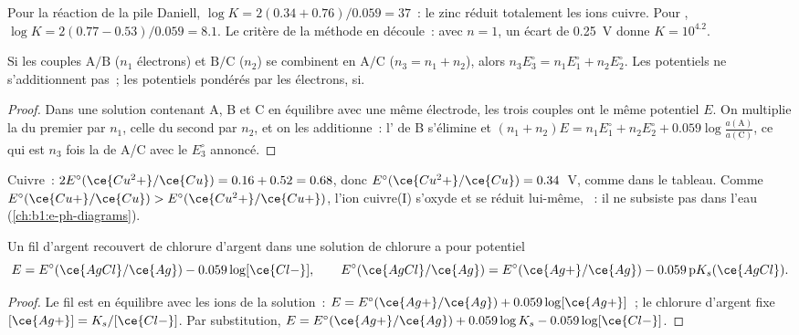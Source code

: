 Pour la réaction de la pile Daniell, $\log K = 2(0.34 + 0.76)/0.059 = 37$~:
le zinc réduit totalement les ions cuivre. Pour
,
$\log K = 2(0.77 - 0.53)/0.059 = 8.1$. Le critère de la méthode en
découle~: avec $n = 1$, un écart de \qty{0.25}{V} donne $K = 10^{4.2}$.

\begin{proposition}\label{prop:b1:nernst:combined-potentials}
Si les couples $\mathrm{A}/\mathrm{B}$ ($n_1$ électrons) et
$\mathrm{B}/\mathrm{C}$ ($n_2$) se combinent en $\mathrm{A}/\mathrm{C}$
($n_3 = n_1 + n_2$), alors $n_3 E^\circ_3 = n_1 E^\circ_1 + n_2 E^\circ_2$.
Les potentiels ne s'additionnent pas~; les potentiels pondérés par les
électrons, si.
\end{proposition}

\begin{proof}
Dans une solution contenant A, B et C en équilibre avec une même
électrode, les trois couples ont le même potentiel $E$. On multiplie la
 du premier par $n_1$, celle du second par $n_2$, et
on les additionne~: l' de B s'élimine et
$(n_1 + n_2)E = n_1E^\circ_1 + n_2E^\circ_2 +
0.059\log\frac{a(\mathrm{A})}{a(\mathrm{C})}$, ce qui est $n_3$ fois la
 de A/C avec le $E^\circ_3$ annoncé.
\end{proof}

Cuivre~: $2E^\circ(\ce{Cu^2+}/\ce{Cu}) = 0.16 + 0.52 = 0.68$, donc
$E^\circ(\ce{Cu^2+}/\ce{Cu}) = 0.34$~V, comme dans le tableau. Comme
$E^\circ(\ce{Cu+}/\ce{Cu}) > E^\circ(\ce{Cu^2+}/\ce{Cu+})$, l'ion
cuivre(I) s'oxyde et se réduit lui-même, ~: il ne
subsiste pas dans l'eau (\cref{ch:b1:e-ph-diagrams}).

\begin{proposition}\label{prop:b1:nernst:second-kind}
Un fil d'argent recouvert de chlorure d'argent dans une solution de
chlorure a pour potentiel
\[
  E = E^\circ(\ce{AgCl}/\ce{Ag}) - 0.059\log[\ce{Cl-}], \qquad
  E^\circ(\ce{AgCl}/\ce{Ag}) = E^\circ(\ce{Ag+}/\ce{Ag}) - 0.059\,\mathrm{p}K_s(\ce{AgCl}) .
\]
\end{proposition}

\begin{proof}
Le fil est en équilibre avec les ions  de la solution~:
$E = E^\circ(\ce{Ag+}/\ce{Ag}) + 0.059\log[\ce{Ag+}]$~; le chlorure
d'argent fixe $[\ce{Ag+}] = K_s/[\ce{Cl-}]$. Par substitution,
$E = E^\circ(\ce{Ag+}/\ce{Ag}) + 0.059\log K_s - 0.059\log[\ce{Cl-}]$.
\end{proof}

